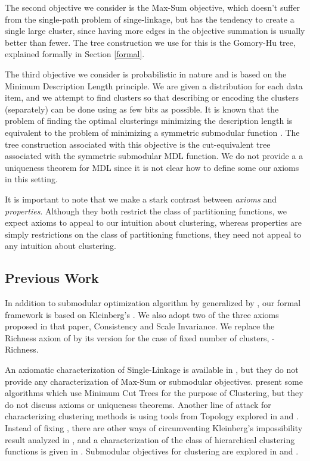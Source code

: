 \documentclass[twoside,11pt]{article}
\begin{document}
The second objective we consider is the Max-Sum objective, which doesn't suffer from
the single-path problem of singe-linkage, but has the tendency to create a single large
cluster, since having more edges in the objective summation is usually better than fewer. The
tree construction we use for this is the Gomory-Hu tree, explained formally in Section \ref{formal}.

The third objective we consider is probabilistic in nature and is based on the Minimum
Description Length principle. We are given a distribution for each data item, and we attempt to find 
clusters so that describing or encoding the clusters
(separately) can be done using as few bits as possible. It is known that the problem
of finding the optimal clusterings minimizing the description length is equivalent to the
problem of minimizing a symmetric submodular function \citep{qclustering}. The tree construction associated with this objective
is the cut-equivalent tree associated with the symmetric submodular MDL function. We do not provide a
a uniqueness theorem for MDL since it is not clear how to define some our axioms in this setting.

It is important to note that we make a stark contrast between \textit{axioms} and \textit{properties}. Although
they both restrict the class of partitioning functions, we expect axioms to appeal to our intuition about clustering,
whereas properties are simply restrictions on the class of partitioning functions, they need not appeal to any
intuition about clustering.

\subsection{Previous Work}

In addition to submodular optimization algorithm by \cite{queyranne} generalized by \cite{rizzi}, our formal framework is based on Kleinberg's \citep{klein1}. We also adopt two of the three axioms proposed in that paper, Consistency and Scale Invariance. We replace the Richness axiom of \cite{klein1} by its version for the case of fixed number of clusters, -Richness.

An axiomatic characterization of Single-Linkage is available in \cite{bosagh2009}, but they do not provide any characterization of Max-Sum or submodular objectives. \cite{flake} present some algorithms which use Minimum Cut Trees for the purpose of Clustering, but they do not discuss axioms or uniqueness theorems. Another line of attack for characterizing clustering methods is using tools from Topology explored in \cite{carlsson2010characterization} and \cite{carlsson2008persistent}. Instead of fixing , there are other ways of circumventing Kleinberg's impossibility result analyzed in \cite{ackerman09}, and a characterization of the class of hierarchical clustering functions is given in \cite{ackerman10}. Submodular objectives for clustering are explored in \cite{steffi} and \cite{qclustering}.
\end{document}
